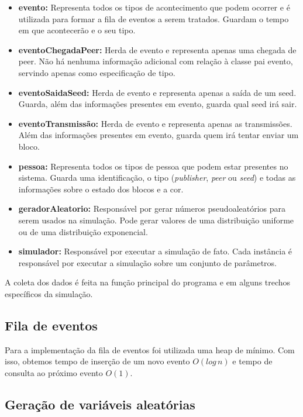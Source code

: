 \documentclass[a4paper,10pt]{article}
\begin{document}
\begin{itemize}
	\item \textbf{evento:} Representa todos os tipos de acontecimento que podem ocorrer e é utilizada para formar a fila de eventos a serem tratados. Guardam o tempo em que acontecerão e o seu tipo.
	\item \textbf{eventoChegadaPeer:} Herda de evento e representa apenas uma chegada de peer. Não há nenhuma informação adicional com relação à classe pai evento, servindo apenas como especificação de tipo.
	\item \textbf{eventoSaidaSeed:} Herda de evento e representa apenas a saída de um seed. Guarda, além das informações presentes em evento, guarda qual seed irá sair.
	\item \textbf{eventoTransmissão:} Herda de evento e representa apenas as transmissões. Além das informações presentes em evento, guarda quem irá tentar enviar um bloco.
	\item \textbf{pessoa:} Representa todos os tipos de pessoa que podem estar presentes no sistema. Guarda uma identificação, o tipo (\textit{publisher}, \textit{peer} ou \textit{seed}) e todas as informações sobre o estado dos blocos e a cor.
	\item \textbf{geradorAleatorio:} Responsável por gerar números pseudoaleatórios para serem usados na simulação. Pode gerar valores de uma distribuição uniforme ou de uma distribuição exponencial.
	\item \textbf{simulador:} Responsável por executar a simulação de fato. Cada instância é responsável por executar a simulação sobre um conjunto de parâmetros.
\end{itemize}

A coleta dos dados é feita na função principal do programa e em alguns trechos específicos da simulação.

\subsection{Fila de eventos}

Para a implementação da fila de eventos foi utilizada uma heap de mínimo. Com isso, obtemos tempo de inserção de um novo evento $O(log\,n)$ e tempo de consulta ao próximo evento $O(1)$.

\subsection{Geração de variáveis aleatórias}
\end{document}

